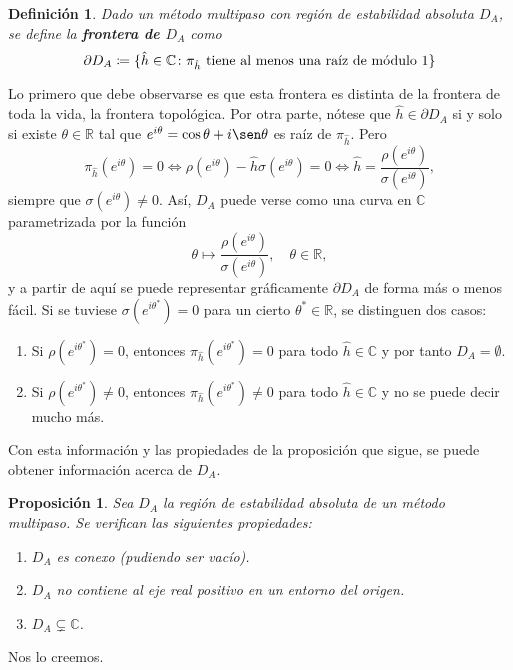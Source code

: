 \documentclass[11pt]{report}
\makeatletter
\renewenvironment{proof}[1][\proofname]{\par
  \pushQED{\qed}%
  \normalfont \topsep\z@skip %
  \trivlist
  \item[\hskip\labelsep
        \itshape
    #1\@addpunct{.}]\ignorespaces
}{%
  \popQED\endtrivlist\@endpefalse
}
\theoremstyle{mytheorem}
\newtheorem{proposition}{Proposición}
\theoremstyle{mydefinition}
\newtheorem{definition}{Definición}
\theoremstyle{myexample}
\let\oldproofname=\proofname
\renewcommand{\proofname}{\rm\bf{\oldproofname}}}
\newenvironment{cdefinition} %
  {\begin{mdframed}[
        linewidth=3pt,
        linecolor=c1,
        bottomline=false,
        topline=false,
        rightline=false,
        innerrightmargin=0pt,
        innertopmargin=0pt,
        innerbottommargin=0pt,
        innerleftmargin=1em, %
        skipabove=\baselineskip]
    \begin{definition}}
  {\end{definition}\end{mdframed}}
\newenvironment{cproposition} %
  {\begin{mdframed}[
        linewidth=3pt,
        linecolor=c2,
        bottomline=false,
        topline=false,
        rightline=false,
        innerrightmargin=0pt,
        innertopmargin=0pt,
        innerbottommargin=0pt,
        innerleftmargin=1em, %
        skipabove=\baselineskip]
    \begin{proposition}}
  {\end{proposition}\end{mdframed}}
\newcommand{\R}{\mathbb R}
\newcommand{\C}{\mathbb C}
\newcommand{\mybf}[1]{\boldmath\textbf{\color{c1}#1}\unboldmath}
\makeatother
\begin{document}
\begin{cdefinition}
Dado un método multipaso con región de estabilidad absoluta $D_A$, se define la \mybf{frontera de $D_A$} como
\[\partial D_A \coloneqq \{\hat{h} \in \C \colon \pi_{\hat{h}} \textup{ tiene al menos una raíz de módulo } 1\}\]
\end{cdefinition}
Lo primero que debe observarse es que esta frontera es distinta de la frontera de toda la vida, la frontera topológica. Por otra parte, nótese que $\hat{h} \in \partial D_A$ si y solo si existe $\theta \in \R$ tal que $e^{i\theta} = \cos \theta +i\sen \theta$ es raíz de $\pi_{\hat{h}}$. Pero
\[\pi_{\hat{h}}(e^{i\theta}) = 0 \iff \rho(e^{i\theta})-\hat{h}\sigma(e^{i\theta}) = 0 \iff \hat{h} = \frac{\rho(e^{i\theta})}{\sigma(e^{i\theta})},\]
siempre que $\sigma(e^{i\theta}) \neq 0$. Así, $D_A$ puede verse como una curva en $\C$ parametrizada por la función
\[\theta \mapsto \frac{\rho(e^{i\theta})}{\sigma(e^{i\theta})}, \quad \theta \in \R,\]
y a partir de aquí se puede representar gráficamente $\partial D_A$ de forma más o menos fácil. Si se tuviese $\sigma(e^{i\theta^*}) = 0$ para un cierto $\theta^* \in \R$, se distinguen dos casos:
\begin{enumerate}
    \item Si $\rho(e^{i\theta^*}) = 0$, entonces $\pi_{\hat{h}}(e^{i\theta^*}) = 0$ para todo $\hat{h} \in \C$ y por tanto $D_A=\emptyset$.
    \item Si $\rho(e^{i\theta^*}) \neq 0$, entonces $\pi_{\hat{h}}(e^{i\theta^*}) \neq 0$ para todo $\hat{h} \in \C$ y no se puede decir mucho más.
\end{enumerate}
Con esta información y las propiedades de la proposición que sigue, se puede obtener información acerca de $D_A$.
\begin{cproposition}
Sea $D_A$ la región de estabilidad absoluta de un método multipaso. Se verifican las siguientes propiedades:
\begin{enumerate}
    \item $D_A$ es conexo (pudiendo ser vacío).
    \item $D_A$ no contiene al eje real positivo en un entorno del origen.
    \item $D_A \subsetneq \C$.
\end{enumerate}
\end{cproposition}

\begin{proof}
Nos lo creemos.
\end{proof}
\end{document}
